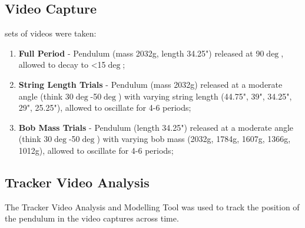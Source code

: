 \documentclass[12pt]{article}
\begin{document}
\subsection{Video Capture}
\label{section:videocapture}
 sets of videos were taken:
\begin{enumerate}
    \item \textbf{Full Period} - Pendulum (mass 2032g, length 34.25") released at 90$\deg$, allowed to decay to <15$\deg$;
    \item \textbf{String Length Trials} - Pendulum (mass 2032g) released at a moderate angle (think 30$\deg$-50$\deg$) with varying string length (44.75", 39", 34.25", 29", 25.25"), allowed to oscillate for 4-6 periods;
    \item \textbf{Bob Mass Trials} - Pendulum (length 34.25") released at a moderate angle (think 30$\deg$-50$\deg$) with varying bob mass (2032g, 1784g, 1607g, 1366g, 1012g), allowed to oscillate for 4-6 periods;
\end{enumerate}
\subsection{Tracker Video Analysis}
\label{section:trackeranalysis}
The Tracker Video Analysis and Modelling Tool\cite{tracker} was used to track the position of the pendulum in the video captures across time.\\
\end{document}
